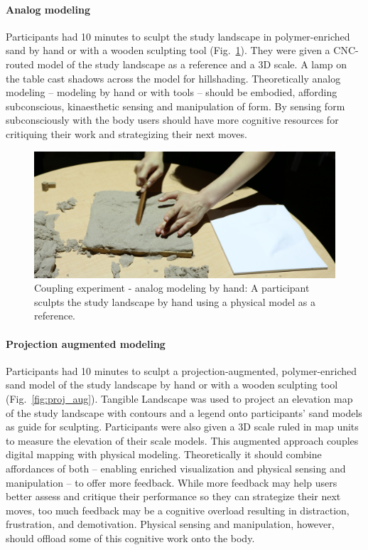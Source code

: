 \documentclass[prodmode,acmtochi]{acmsmall} %
\begin{document}
\paragraph{Analog modeling}
Participants had 10 minutes to sculpt the study landscape in polymer-enriched sand 
by hand or with a wooden sculpting tool (Fig.~\ref{fig:analog}).  
They were given a CNC-routed model of the study landscape as a reference
and a 3D scale. 
A lamp on the table cast shadows across the model for hillshading.
Theoretically analog modeling -- modeling by hand or with tools -- should be embodied, 
affording subconscious, kinaesthetic sensing and manipulation of form. 
By sensing form subconsciously with the body
users should have more cognitive resources for critiquing their work 
and strategizing their next moves. 

\begin{figure}
\begin{center}
	\includegraphics[width=\textwidth]{images/experiments/connie_analog_1.jpg}
	\caption{Coupling experiment - analog modeling by hand:
	A participant sculpts the study landscape by hand
	using a physical model as a reference.}
	\label{fig:analog}
\end{center}
\end{figure}

\paragraph{Projection augmented modeling}
Participants had 10 minutes to sculpt
a projection-augmented, polymer-enriched sand model
of the study landscape by hand or with a wooden sculpting tool 
(Fig.~\ref{fig:proj_aug}). 
Tangible Landscape was used to project 
an elevation map of the study landscape
with contours and a legend
onto participants' sand models as guide for sculpting. 
Participants were also given a 3D scale ruled in map units
to measure the elevation of their scale models. 
This augmented approach couples digital mapping with physical modeling.
Theoretically it should combine affordances of both -- 
enabling enriched visualization and physical sensing and manipulation -- 
to offer more feedback.
While more feedback may help users better assess and critique their performance 
so they can strategize their next moves,
too much feedback may be a cognitive overload 
resulting in distraction, frustration, and demotivation. 
Physical sensing and manipulation, however, should offload 
some of this cognitive work onto the body.
\end{document}
